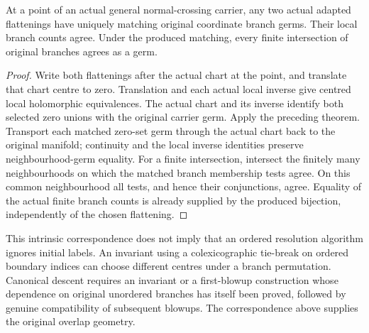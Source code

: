 \begin{corollary}
\label{hir:original-normal-crossing-branch-overlap}
\leanok
At a point of an actual general normal-crossing carrier, any two actual
adapted flattenings have uniquely matching original coordinate branch
germs. Their local branch counts agree. Under the produced matching,
every finite intersection of original branches agrees as a germ.
\end{corollary}
\begin{proof}
Write both flattenings after the actual chart at the point, and translate
that chart centre to zero. Translation and each actual local inverse
give centred local holomorphic equivalences. The actual chart and its
inverse identify both selected zero unions with the original carrier
germ. Apply the preceding theorem. Transport each matched zero-set germ
through the actual chart back to the original manifold; continuity and
the local inverse identities preserve neighbourhood-germ equality.
For a finite intersection, intersect the finitely many neighbourhoods
on which the matched branch membership tests agree. On this common
neighbourhood all tests, and hence their conjunctions, agree. Equality
of the actual finite branch counts is already supplied by the produced
bijection, independently of the chosen flattening.
\end{proof}

\begin{remark}
This intrinsic correspondence does not imply that an ordered resolution
algorithm ignores initial labels. An invariant using a colexicographic
tie-break on ordered boundary indices can choose different centres under
a branch permutation. Canonical descent requires an invariant or a
first-blowup construction whose dependence on original unordered branches
has itself been proved, followed by genuine compatibility of subsequent
blowups. The correspondence above supplies the original overlap geometry.
\end{remark}
